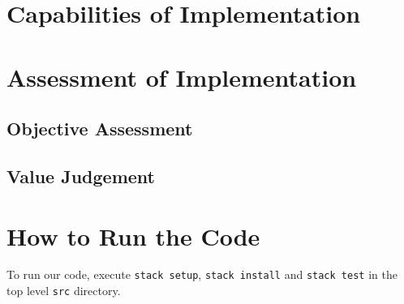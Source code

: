 \documentclass{article}
\begin{document}
\section{Capabilities of Implementation}


\section{Assessment of Implementation}
\subsection{Objective Assessment}


\subsection{Value Judgement}


\section{How to Run the Code}
To run our code, execute \texttt{stack setup}, \texttt{stack install} and \texttt{stack test} in the top level \texttt{src} directory.
\end{document}
